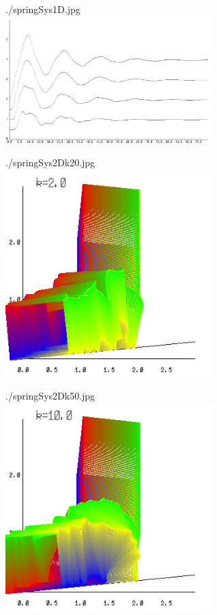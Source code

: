 \documentclass[12pt, a4paper]{article}
\begin{document}
\begin{center}
./springSys1D.jpg\\
\includegraphics[width=8cm]{./springSys1D.jpg}
\end{center} 

\begin{center}
./springSys2Dk20.jpg\\
\includegraphics[width=8cm]{./springSys2Dk2.jpg}
\end{center} 
\newpage
\begin{center}
./springSys2Dk50.jpg\\
\includegraphics[width=8cm]{./springSys2Dk10.jpg}
\end{center} 
\end{document}
